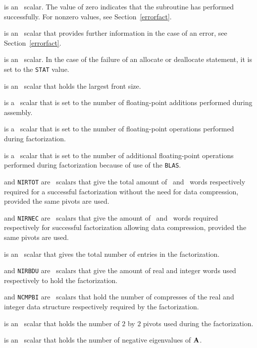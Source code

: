 \documentclass{galahad}
\begin{document}
\begin{description}

 is an \integer\ scalar. The value
 of zero indicates that the subroutine has performed
 successfully.  For nonzero values, see Section~\ref{errorfact}.

 is an \integer\ scalar that provides further information in the
case of an error, see Section~\ref{errorfact}.

 is an \integer\ scalar. In the case of the failure of an
allocate or deallocate statement, it is set to the {\tt STAT} value.

  is an \integer\ scalar that holds the largest front size.

 is a \realdp\ scalar that is set to the number of
 floating-point additions performed during assembly.

 is a \realdp\ scalar that is set to the number of
 floating-point operations performed during factorization.

 is a \realdp\ scalar that is set to the number of
 additional floating-point operations performed during factorization
 because of use of the {\tt BLAS}.

 and {\tt NIRTOT} are \integer\ scalars that give the total
 amount of \realdp\ and \integer\ words respectively required for a
 successful factorization without the need for data compression,
 provided the same pivots are used.

 and {\tt NIRNEC} are \integer\ scalars that give the amount
 of  \realdp\ and \integer\ words required respectively for successful
 factorization allowing data compression, provided
 the same pivots are used.

 is an \integer\ scalar that gives the total number of
 entries in the factorization.

 and {\tt NIRBDU} are \integer\ scalars that give the amount of
 real and integer words used respectively to hold the factorization.

 and {\tt NCMPBI} are \integer\ scalars that hold the number of
 compresses of the real and integer data structure respectively
 required by the factorization.

 is an \integer\ scalar that holds
 the number of $2$ by $2$ pivots used during the factorization.

 is an \integer\ scalar that holds
 the number of negative eigenvalues of ${\mathbf{A}}$.


\end{description}
\end{document}
